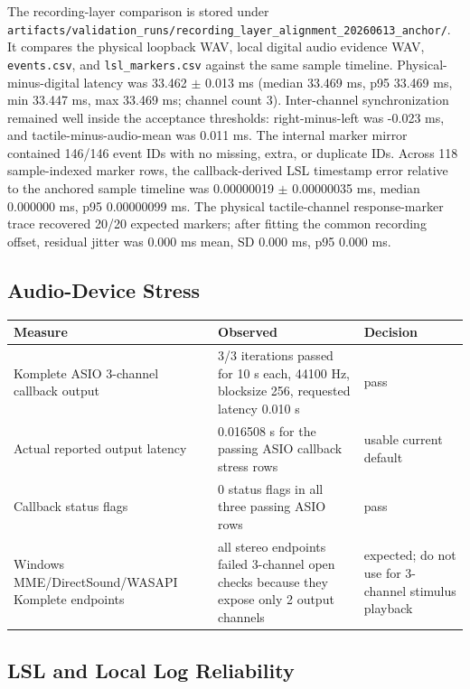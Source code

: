 \documentclass[11pt]{article}
\begin{document}
The recording-layer comparison is stored under
\texttt{artifacts/validation\_runs/recording\_layer\_alignment\_20260613\_anchor/}.
It compares the physical loopback WAV, local digital audio evidence WAV,
\texttt{events.csv}, and \texttt{lsl\_markers.csv} against the same sample
timeline. Physical-minus-digital latency was 33.462 $\pm$ 0.013 ms
(median 33.469 ms, p95 33.469 ms, min 33.447 ms, max 33.469 ms; channel count
3). Inter-channel synchronization remained well inside the acceptance
thresholds: right-minus-left was -0.023 ms, and tactile-minus-audio-mean was
0.011 ms. The internal marker mirror contained 146/146 event IDs with no
missing, extra, or duplicate IDs. Across 118 sample-indexed marker rows, the
callback-derived LSL timestamp error relative to the anchored sample timeline
was 0.00000019 $\pm$ 0.00000035 ms, median 0.000000 ms, p95 0.00000099 ms.
The physical tactile-channel response-marker trace recovered 20/20 expected
markers; after fitting the common recording offset, residual jitter was
0.000 ms mean, SD 0.000 ms, p95 0.000 ms.

\subsection{Audio-Device Stress}

\begin{longtable}{|p{}|p{}|p{}|}
\hline
\textbf{Measure} & \textbf{Observed} & \textbf{Decision} \\
\hline
Komplete ASIO 3-channel callback output & 3/3 iterations passed for 10 s each,
44100 Hz, blocksize 256, requested latency 0.010 s & pass \\
\hline
Actual reported output latency & 0.016508 s for the passing ASIO callback
stress rows & usable current default \\
\hline
Callback status flags & 0 status flags in all three passing ASIO rows & pass \\
\hline
Windows MME/DirectSound/WASAPI Komplete endpoints & all stereo endpoints failed
3-channel open checks because they expose only 2 output channels & expected;
do not use for 3-channel stimulus playback \\
\hline
\end{longtable}

\subsection{LSL and Local Log Reliability}
\end{document}
